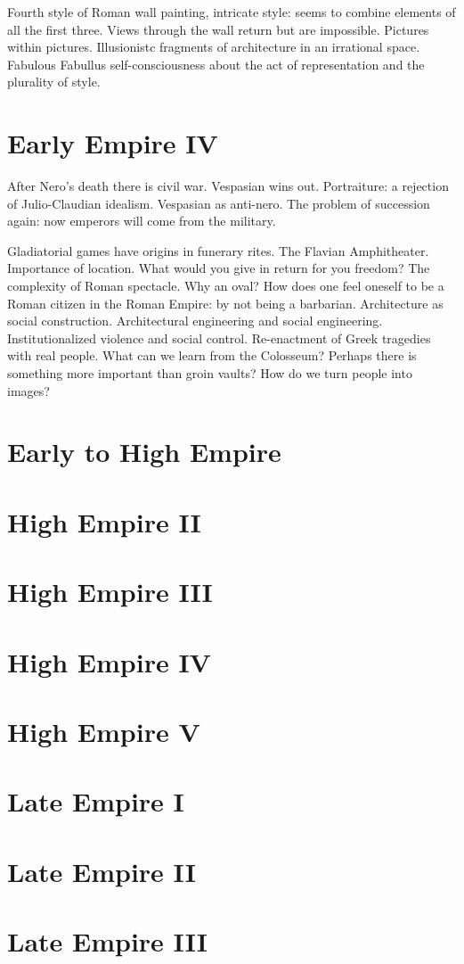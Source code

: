 \documentclass[10pt]{armath}
\begin{document}
Fourth style of Roman wall painting, intricate style: seems to combine elements
of all the first three. Views through the wall return but are impossible.
Pictures within pictures. Illusionistc fragments of architecture in an
irrational space. Fabulous Fabullus self-consciousness about the act of
representation and the plurality of style.

\section{Early Empire IV}%
\label{sec:early_empire_iv}

After Nero's death there is civil war. Vespasian wins out. Portraiture: a
rejection of Julio-Claudian idealism. Vespasian as anti-nero. The problem of
succession again: now emperors will come from the military.

Gladiatorial games have origins in funerary rites. The Flavian Amphitheater.
Importance of location. What would you give in return for you freedom? The
complexity of Roman spectacle. Why an oval? How does one feel oneself to be a
Roman citizen in the Roman Empire: by not being a barbarian. Architecture as
social construction. Architectural engineering and social engineering.
Institutionalized violence and social control. Re-enactment of Greek tragedies
with real people. What can we learn from the Colosseum? Perhaps there is
something more important than groin vaults? How do we turn people into images?

\section{Early to High Empire}%
\label{sec:early_to_high_empire}

\section{High Empire II}%
\label{sec:high_empire_ii}

\section{High Empire III}%
\label{sec:high_empire_iii}

\section{High Empire IV}%
\label{sec:high_empire_iv}

\section{High Empire V}%
\label{sec:high_empire_v}

\section{Late Empire I}%
\label{sec:late_empire_i}

\section{Late Empire II}%
\label{sec:late_empire_ii}

\section{Late Empire III}%
\label{sec:late_empire_iii}
\end{document}
